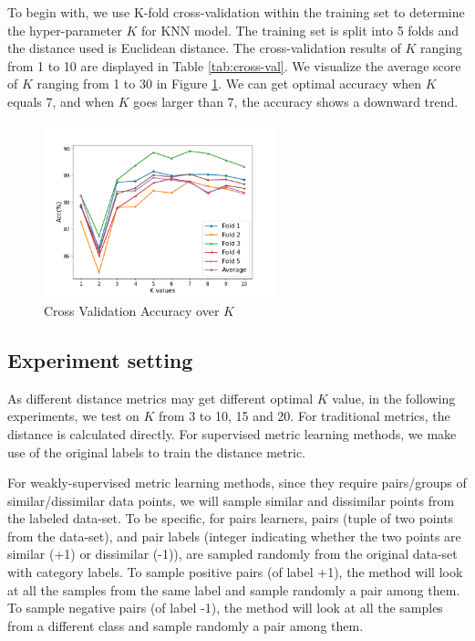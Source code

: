 To begin with, we use K-fold cross-validation within the training set to determine the hyper-parameter $K$ for KNN model. The training set is split into 5 folds and the distance used is Euclidean distance. The cross-validation results of $K$ ranging from 1 to 10 are displayed in Table \ref{tab:cross-val}. We visualize the average score of $K$ ranging from 1 to 30 in Figure \ref{fig:cvk}. We can get optimal accuracy when $K$ equals 7, and when $K$ goes larger than 7, the accuracy shows a downward trend.

\begin{figure}
    \centering
    \includegraphics[width=0.6\textwidth]{img/KNN_res.png}
    \caption{Cross Validation Accuracy over $K$}
    \label{fig:cvk}
\end{figure}


\subsection{Experiment setting}

As different distance metrics may get different optimal $K$ value, in the following experiments, we test on $K$ from 3 to 10, 15 and 20. For traditional metrics, the distance is calculated directly. For supervised metric learning methods, we make use of the original labels to train the distance metric. 

For weakly-supervised metric learning methods, since they require pairs/groups of similar/dissimilar data points,
we will sample similar and dissimilar points from the labeled data-set. To be specific, for pairs learners, pairs (tuple of two points from the data-set), and pair labels (integer indicating whether the two points are similar (+1) or dissimilar (-1)), are sampled randomly from the original data-set with category labels. To sample positive pairs (of label +1), the method will look at all the samples from the same label and sample randomly a pair among them. To sample negative pairs (of label -1), the method will look at all the samples from a different class and sample randomly a pair among them.